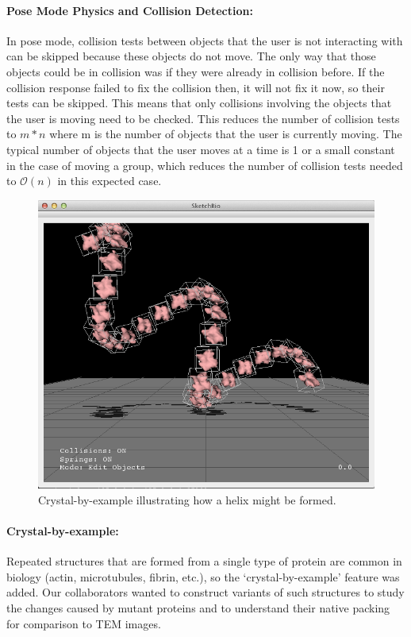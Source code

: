 \documentclass[twocolumn]{bmcart}%
\begin{document}
\paragraph*{Pose Mode Physics and Collision Detection:}
In pose mode, collision tests between objects that the user is not interacting with can be skipped because these objects do not move.  The only way that those objects could be in collision was if they were already in collision before.  If the collision response failed to fix the collision then, it will not fix it now, so their tests can be skipped.  This means that only collisions involving the objects that the user is moving need to be checked.  This reduces the number of collision tests to $m*n$ where m is the number of objects that the user is currently moving.  The typical number of objects that the user moves at a time is 1 or a small constant in the case of moving a group, which reduces the number of collision tests needed to $\mathcal{O}(n)$ in this expected case.

\begin{figure}[h]
\centering
\includegraphics[width=0.9\columnwidth]{crystalByExample.png}
\caption{Crystal-by-example illustrating how a helix might be formed.}
\label{fig:crystal_by_example}
\end{figure}
\paragraph*{Crystal-by-example:}
Repeated structures that are formed from a single type of protein are common in biology (actin, microtubules, fibrin, etc.), so the ‘crystal-by-example' feature was added.  Our collaborators wanted to construct variants of such structures to study the changes caused by mutant proteins and to understand their native packing for comparison to TEM images.
\end{document}
